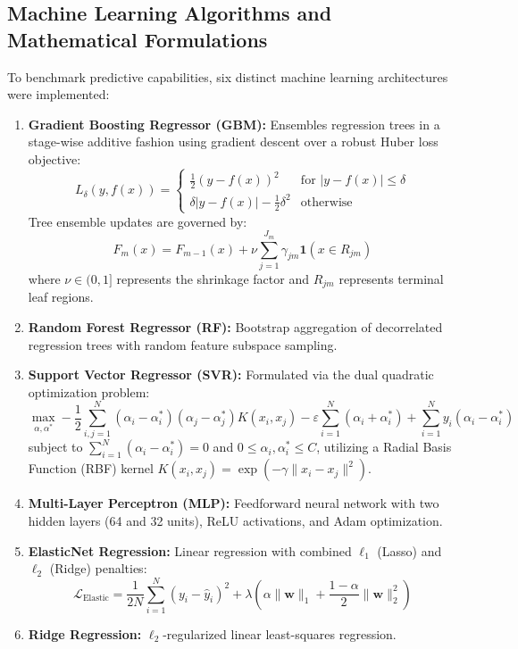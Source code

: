 \documentclass[journal]{IEEEtran}
\begin{document}
\subsection{Machine Learning Algorithms and Mathematical Formulations}
To benchmark predictive capabilities, six distinct machine learning architectures were implemented:
\begin{enumerate}
    \item \textbf{Gradient Boosting Regressor (GBM):} Ensembles regression trees in a stage-wise additive fashion using gradient descent over a robust Huber loss objective:
    \begin{equation}
    L_\delta(y, f(x)) = \begin{cases} \frac{1}{2}(y - f(x))^2 & \text{for } |y - f(x)| \le \delta \\ \delta |y - f(x)| - \frac{1}{2}\delta^2 & \text{otherwise} \end{cases}
    \end{equation}
    Tree ensemble updates are governed by:
    \begin{equation}
    F_m(x) = F_{m-1}(x) + \nu \sum_{j=1}^{J_m} \gamma_{jm} \mathbf{1}(x \in R_{jm})
    \end{equation}
    where $\nu \in (0, 1]$ represents the shrinkage factor and $R_{jm}$ represents terminal leaf regions.
    \item \textbf{Random Forest Regressor (RF):} Bootstrap aggregation of decorrelated regression trees with random feature subspace sampling.
    \item \textbf{Support Vector Regressor (SVR):} Formulated via the dual quadratic optimization problem:
    \begin{equation}
    \max_{\alpha, \alpha^*} -\frac{1}{2}\sum_{i,j=1}^N (\alpha_i - \alpha_i^*)(\alpha_j - \alpha_j^*) K(x_i, x_j) - \varepsilon\sum_{i=1}^N (\alpha_i + \alpha_i^*) + \sum_{i=1}^N y_i (\alpha_i - \alpha_i^*)
    \end{equation}
    subject to $\sum_{i=1}^N (\alpha_i - \alpha_i^*) = 0$ and $0 \le \alpha_i, \alpha_i^* \le C$, utilizing a Radial Basis Function (RBF) kernel $K(x_i, x_j) = \exp(-\gamma \|x_i - x_j\|^2)$.
    \item \textbf{Multi-Layer Perceptron (MLP):} Feedforward neural network with two hidden layers (64 and 32 units), ReLU activations, and Adam optimization.
    \item \textbf{ElasticNet Regression:} Linear regression with combined $\ell_1$ (Lasso) and $\ell_2$ (Ridge) penalties:
    \begin{equation}
    \mathcal{L}_{\text{Elastic}} = \frac{1}{2N}\sum_{i=1}^N (y_i - \hat{y}_i)^2 + \lambda \left( \alpha \|\mathbf{w}\|_1 + \frac{1-\alpha}{2} \|\mathbf{w}\|_2^2 \right)
    \end{equation}
    \item \textbf{Ridge Regression:} $\ell_2$-regularized linear least-squares regression.
\end{enumerate}
\end{document}
